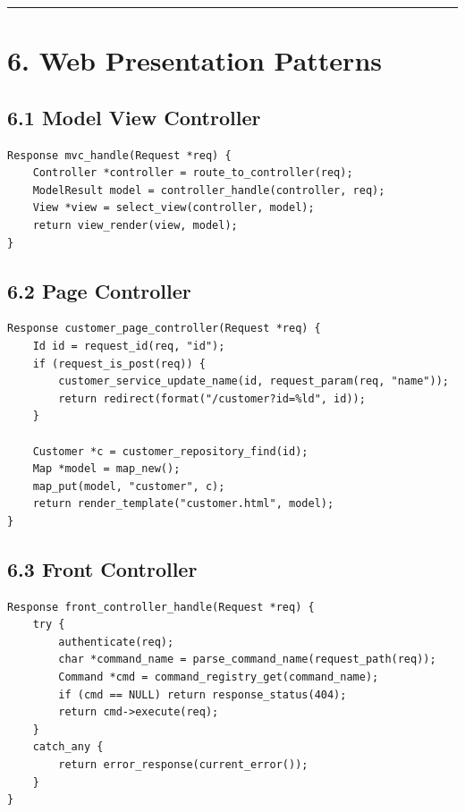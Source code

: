 \documentclass[11pt]{article}
\begin{document}
\begin{center}\rule{0.5\linewidth}{0.5pt}\end{center}

\section{6. Web Presentation Patterns}\label{web-presentation-patterns}

\subsection{6.1 Model View Controller}\label{model-view-controller}

\begin{verbatim}
Response mvc_handle(Request *req) {
    Controller *controller = route_to_controller(req);
    ModelResult model = controller_handle(controller, req);
    View *view = select_view(controller, model);
    return view_render(view, model);
}
\end{verbatim}

\subsection{6.2 Page Controller}\label{page-controller}

\begin{verbatim}
Response customer_page_controller(Request *req) {
    Id id = request_id(req, "id");
    if (request_is_post(req)) {
        customer_service_update_name(id, request_param(req, "name"));
        return redirect(format("/customer?id=%ld", id));
    }

    Customer *c = customer_repository_find(id);
    Map *model = map_new();
    map_put(model, "customer", c);
    return render_template("customer.html", model);
}
\end{verbatim}

\subsection{6.3 Front Controller}\label{front-controller}

\begin{verbatim}
Response front_controller_handle(Request *req) {
    try {
        authenticate(req);
        char *command_name = parse_command_name(request_path(req));
        Command *cmd = command_registry_get(command_name);
        if (cmd == NULL) return response_status(404);
        return cmd->execute(req);
    }
    catch_any {
        return error_response(current_error());
    }
}
\end{verbatim}
\end{document}
